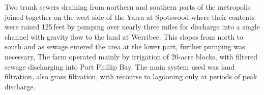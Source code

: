 Two trunk sewers draining from northern and southern parts of the
metro\-po\-lis joined together on the west side of the Yarra
 at Spotswood  
where their contents were raised 125\,feet by pumping over nearly
three miles for discharge into a single
channel with gravity flow to the
land at Werribee.  This slopes from north to south and as sewage
entered the area at the lower part, further pumping was necessary, The
farm operated mainly by irrigation of 20-acre blocks, with filtered
sewage discharging into Port Phillip Bay.  The main system used was
land filtration, also grass filtration, with recourse to lagooning
only at periods of peak discharge.


